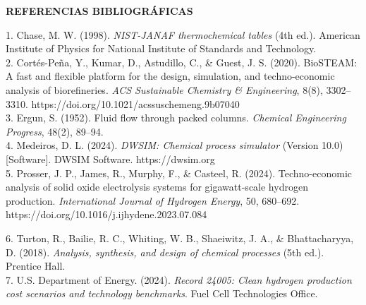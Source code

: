 \documentclass[12pt]{article}
\begin{document}
\begin{tcolorbox}[
    enhanced,
    colback=primaryblue,
    colframe=pyyellow,
    boxrule=3.5pt,
    arc=8pt,
    top=16pt,
    bottom=16pt,
    left=22pt,
    right=22pt
]
    {\color{pyyellow}\fontsize{19}{24}\selectfont\bfseries REFERENCIAS BIBLIOGRÁFICAS}\\[8pt]
    \fontsize{13.5}{17.2}\selectfont\color{white}
    \begin{minipage}[t]{0.495\linewidth}
        \hangindent=18pt 
        1. Chase, M. W. (1998). \textit{NIST-JANAF thermochemical tables} (4th ed.). American Institute of Physics for National Institute of Standards and Technology.\\[6pt]
        \hangindent=18pt 
        2. Cortés-Peña, Y., Kumar, D., Astudillo, C., \& Guest, J. S. (2020). BioSTEAM: A fast and flexible platform for the design, simulation, and techno-economic analysis of biorefineries. \textit{ACS Sustainable Chemistry \& Engineering}, 8(8), 3302--3310. https://doi.org/10.1021/acssuschemeng.9b07040\\[6pt]
        \hangindent=18pt 
        3. Ergun, S. (1952). Fluid flow through packed columns. \textit{Chemical Engineering Progress}, 48(2), 89--94.\\[6pt]
        \hangindent=18pt 
        4. Medeiros, D. L. (2024). \textit{DWSIM: Chemical process simulator} (Version 10.0) [Software]. DWSIM Software. https://dwsim.org\\[6pt]
        \hangindent=18pt 
        5. Prosser, J. P., James, R., Murphy, F., \& Casteel, R. (2024). Techno-economic analysis of solid oxide electrolysis systems for gigawatt-scale hydrogen production. \textit{International Journal of Hydrogen Energy}, 50, 680--692. https://doi.org/10.1016/j.ijhydene.2023.07.084
    \end{minipage}%
    \hfill
    \begin{minipage}[t]{0.495\linewidth}
        \hangindent=18pt 
        6. Turton, R., Bailie, R. C., Whiting, W. B., Shaeiwitz, J. A., \& Bhattacharyya, D. (2018). \textit{Analysis, synthesis, and design of chemical processes} (5th ed.). Prentice Hall.\\[6pt]
        \hangindent=18pt 
        7. U.S. Department of Energy. (2024). \textit{Record 24005: Clean hydrogen production cost scenarios and technology benchmarks}. Fuel Cell Technologies Office.\\[6pt]

\end{minipage}
\end{tcolorbox}
\end{document}

